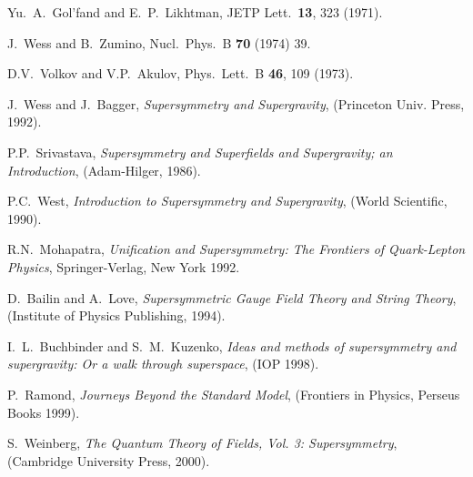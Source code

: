 \documentclass[11pt]{article}
\begin{document}
\begin{thebibliography}{999}
Yu.~A.~Gol'fand and E.~P.~Likhtman,
  JETP Lett.\  {\bf 13}, 323 (1971).

J.~Wess and B.~Zumino,
  Nucl.\ Phys.\ B {\bf 70} (1974) 39.

D.V.~Volkov and V.P.~Akulov,
  Phys.\ Lett.\ B {\bf 46}, 109 (1973).

J.~Wess and J.~Bagger,
  {\em Supersymmetry and Supergravity},
  (Princeton Univ. Press, 1992).

P.P.~Srivastava, 
  {\em Supersymmetry and Superfields and Supergravity; an Introduction}, 
  (Adam-Hilger, 1986).  

P.C.~West, 
  {\em Introduction to Supersymmetry and Supergravity}, 
  (World Scientific, 1990). 

R.N.~Mohapatra,
  {\em Unification and Supersymmetry: The Frontiers of
  Quark-Lepton Physics}, Springer-Verlag, New York 1992.  

D.~Bailin and A.~Love,
  {\em Supersymmetric Gauge Field Theory and String Theory},
  (Institute of Physics Publishing, 1994).

  I.~L.~Buchbinder and S.~M.~Kuzenko,
  {\em Ideas and methods of supersymmetry and supergravity: Or a walk through superspace},
  (IOP 1998).
  
P.~Ramond, 
  {\em Journeys Beyond the Standard Model},
  (Frontiers in Physics, Perseus Books 1999).

S.~Weinberg, 
  {\em The Quantum Theory of Fields, Vol. 3: Supersymmetry},
  (Cambridge University Press, 2000).


\end{thebibliography}
\end{document}
